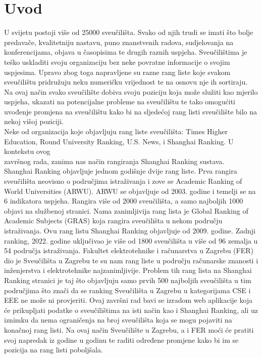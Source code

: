 \documentclass[times, utf8, zavrsni]{fer}
\begin{document}
\chapter{Uvod}
U svijetu postoji više od 25000 sveučilišta. Svako od njih trudi se imati što bolje predavače, kvalitetniju nastavu, puno znanstvenih radova, sudjelovanja na konferencijama,
objava u časopisima te drugih raznih uspjeha. Sveučilištima je teško uskladiti svoju organizaciju bez neke povratne informacije o svojim uspjesima. Upravo zbog toga napravljene su razne
rang liste koje svakom sveučilištu pridružuju neku numeričku vrijednost te na osnovu nje ih sortiraju. Na ovaj način svako sveučilište dobiva svoju poziciju 
koja može služiti kao mjerilo uspjeha, ukazati na potencijalne probleme na sveučilištu te tako omogućiti uvođenje promjena na sveučilištu kako bi 
na sljedećoj rang listi sveučilište bilo na nekoj višoj poziciji.\\ Neke od organizacija koje objavljuju rang liste sveučilišta: Times Higher Education, Round University Ranking,
U.S. News, i Shanghai Ranking. U kontekstu ovog \\završnog rada, zanima nas način rangiranja Shanghai Ranking sustava. \\ Shanghai Ranking objavljuje jednom godišnje dvije 
rang liste. Prva rangira sveučilišta neovisno o područjima istraživanja i zove se Academic Ranking of World Universities (ARWU). ARWU se objavljuje od 2003. godine i  
temelji se na 6 indikatora uspjeha. Rangira više od 2000 sveučilišta, a samo najboljih 1000 objavi na službenoj stranici. Nama zanimljivija rang lista je Global Ranking of Academic Subjects
(GRAS) koja rangira sveučilišta u nekom području istraživanja. Ovu rang listu Shanghai Ranking objavljuje od 2009. godine. Zadnji ranking, 2022. godine uključivao je više od 1800 sveučilišta 
u više od 96 zemalja u 54 područja istraživanja. Fakultet elektrotehnike i računarstva u Zagrebu (FER) dio je Sveučilišta u Zagrebu te su nam rang liste u području 
računarske znanosti i inženjerstva  i elektrotehnike  najzanimljivije. Problem tih rang lista 
na Shanghai Ranking stranici je taj što objavljuju samo prvih 500 najboljih sveučilišta u tim područjima što znači da se ranking Sveučilišta u Zagrebu u kategorijama
CSE i EEE ne može ni provjeriti. 
Ovaj završni rad bavi se izradom web aplikacije koja će prikupljati podatke o sveučilištima na isti način kao i Shanghai Ranking, ali uz iznimku da nema ograničenja na 
broj sveučilišta koja se mogu pojaviti na konačnoj rang listi. Na ovaj način Sveučilište u Zagrebu, a i FER moći će pratiti svoj napredak iz godine u godinu te raditi određene 
promjene kako bi im se pozicija na rang listi poboljšala. 
\end{document}
